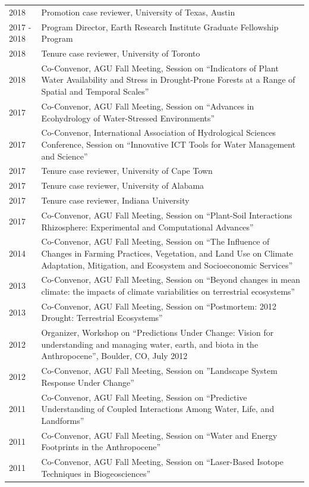 \begin{longtable}{l p{5.5in}}
2018 & Promotion case reviewer, University of Texas, Austin \\
2017 - 2018 & Program Director, Earth Research Institute Graduate Fellowship Program \\
2018 & Tenure case reviewer, University of Toronto \\
2018 & Co-Convenor, AGU Fall Meeting, Session on ``Indicators of Plant Water Availability and Stress in Drought-Prone Forests at a Range of Spatial and Temporal Scales'' \\
2017 & Co-Convenor, AGU Fall Meeting, Session on ``Advances in Ecohydrology of Water-Stressed Environments'' \\
2017 & Co-Convenor, International Association of Hydrological Sciences Conference, Session on ``Innovative ICT Tools for Water Management and Science'' \\
2017 & Tenure case reviewer, University of Cape Town \\
2017 & Tenure case reviewer, University of Alabama \\
2017 & Tenure case reviewer, Indiana University \\
2017 & Co-Convenor, AGU Fall Meeting, Session on ``Plant-Soil Interactions Rhizosphere: Experimental and Computational Advances'' \\
2014 & Co-Convenor, AGU Fall Meeting, Session on ``The Influence of Changes in Farming Practices, Vegetation, and Land Use on Climate Adaptation, Mitigation, and Ecosystem and Socioeconomic Services'' \\
2013 & Co-Convenor, AGU Fall Meeting, Session on ``Beyond changes in mean climate: the impacts of climate variabilities on terrestrial ecosystems'' \\
2013 & Co-Convenor, AGU Fall Meeting, Session on ``Postmortem: 2012 Drought: Terrestrial Ecosystems'' \\
2012 & Organizer, Workshop on ``Predictions Under Change: Vision for understanding and managing water, earth, and biota in the Anthropocene'', Boulder, CO, July 2012 \\
2012 & Co-Convenor, AGU Fall Meeting, Session on ''Landscape System Response Under Change'' \\
2011 & Co-Convenor, AGU Fall Meeting, Session on ``Predictive Understanding of Coupled Interactions Among Water, Life, and Landforms'' \\
2011 & Co-Convenor, AGU Fall Meeting, Session on ``Water and Energy Footprints in the Anthropocene'' \\
2011 & Co-Convenor, AGU Fall Meeting, Session on ``Laser-Based Isotope Techniques in Biogeosciences'' \\

\end{longtable}
